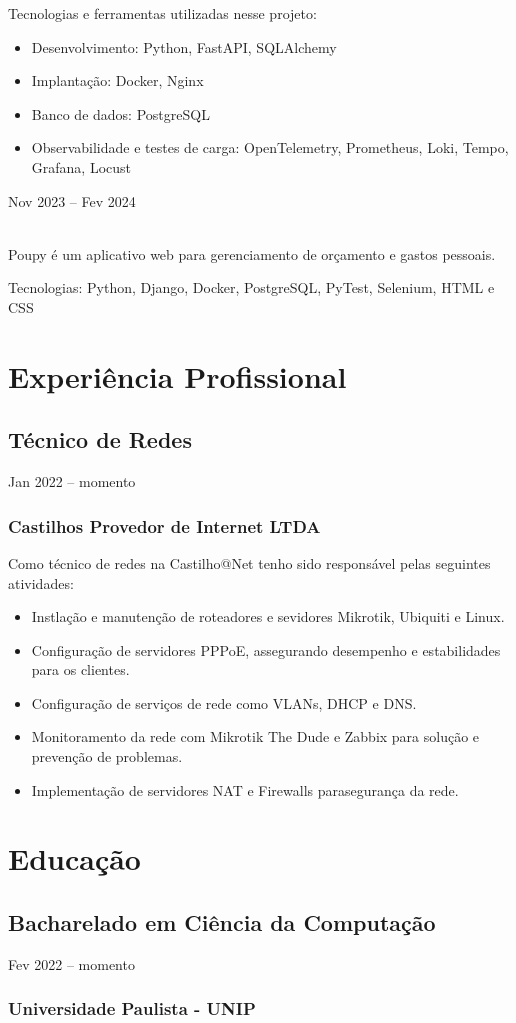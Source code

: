 \documentclass{cv}
\begin{document}
Tecnologias e ferramentas utilizadas nesse projeto:

\begin{itemize}
  \item Desenvolvimento: Python, FastAPI, SQLAlchemy
  \item Implantação: Docker, Nginx
  \item Banco de dados: PostgreSQL
  \item Observabilidade e testes de carga: OpenTelemetry, Prometheus,
    Loki, Tempo, Grafana, Locust
\end{itemize}

\hfill{Nov 2023 -- Fev 2024}\\
\\
\vspace{0.15cm}

Poupy é um aplicativo web para gerenciamento de orçamento e gastos pessoais.

\vspace{0.08cm}

Tecnologias: Python, Django, Docker, PostgreSQL, PyTest, Selenium, HTML e CSS

\section{Experiência Profissional}

\subsection{Técnico de Redes}
{Jan 2022 -- momento}
\subsubsection{Castilhos Provedor de Internet LTDA}

Como técnico de redes na Castilho@Net tenho sido responsável pelas
seguintes atividades:

\begin{itemize}
  \item Instlação e manutenção de roteadores e sevidores Mikrotik,
    Ubiquiti e Linux.
  \item Configuração de servidores PPPoE, assegurando desempenho e
    estabilidades para os clientes.
  \item Configuração de serviços de rede como VLANs, DHCP e DNS.
  \item Monitoramento da rede com Mikrotik The Dude e Zabbix para
    solução e prevenção de problemas.
  \item Implementação de servidores NAT e Firewalls parasegurança da rede.
\end{itemize}

\section{Educação}

\subsection{Bacharelado em Ciência da Computação}
{Fev 2022 -- momento}
\subsubsection{Universidade Paulista - UNIP}
\end{document}
